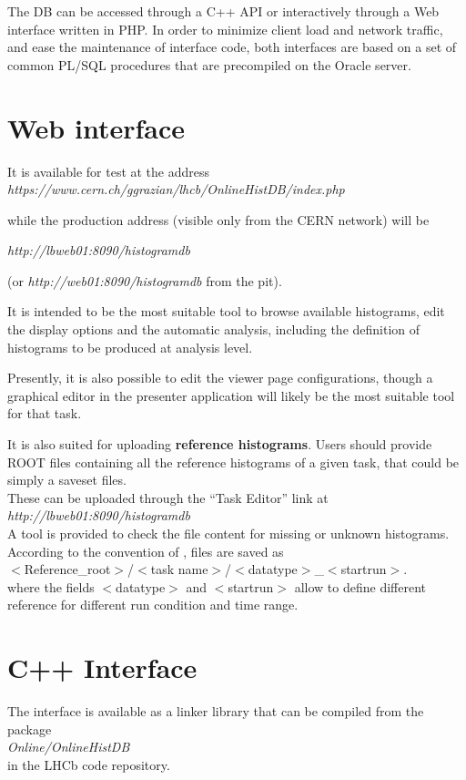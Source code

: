 \documentclass{lhcbnote}
\begin{document}
The DB can be accessed through a C++ API or interactively through a
Web interface written in PHP. In order to minimize client load and
network traffic, and ease the maintenance of interface code, both
interfaces  are based on a set of common PL/SQL procedures that are
precompiled on the Oracle server.

\section{Web interface}

It is available for test at the address\\
{\it https://www.cern.ch/ggrazian/lhcb/OnlineHistDB/index.php}

while the production address (visible only from the CERN network)
will be \\
\centerline{ \it http://lbweb01:8090/histogramdb}  
(or { \it http://web01:8090/histogramdb} from the pit).

It is intended to be the most suitable tool to browse available
histograms, edit the display options and the automatic analysis, including
the definition of histograms to be produced at analysis level.

Presently, it is also possible to edit the viewer page configurations, though
a graphical editor in the presenter application will likely be the
most suitable tool for that task.

It is also suited for uploading {\bf reference histograms}. Users should
provide ROOT files containing all the reference histograms of a given
task, that could be simply a saveset files. \\
These can be uploaded through the ``Task Editor'' link at \\
{ \it http://lbweb01:8090/histogramdb} \\
A tool is provided to check the file content for missing or unknown histograms.
According to the convention of \cite{dbdesign}, files are saved as \\
$<$Reference\_root$>$/$<$task name$>$/$<$datatype$>$\_$<$startrun$>$.\\
where the fields $<$datatype$>$ and $<$startrun$>$ allow to define
different reference for different run condition and time range. 

\section{C++ Interface}

The interface is available as a linker library that can be compiled from
the package \\
{\it Online/OnlineHistDB} \\
in the LHCb code repository.
\end{document}
